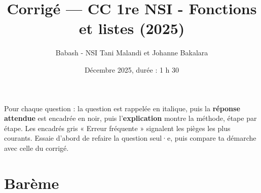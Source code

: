 \documentclass[addpoints, 11pt]{exam}
\title{Corrigé --- CC 1re NSI - Fonctions et listes (2025)}
\author{Babash - NSI Tani Malandi et Johanne Bakalara}
\date{Décembre 2025, durée : 1 h 30}
\DeclareRobustCommand{\_}{\textunderscore\allowbreak}
\begin{document}
\pagestyle{headandfoot}
\firstpageheader{}{}{}

\maketitle
\thispagestyle{headandfoot}

\begin{astuce}
Pour chaque question : la question est rappelée en italique, puis la \textbf{réponse attendue} est encadrée en noir, puis l'\textbf{explication} montre la méthode, étape par étape.
Les encadrés gris « Erreur fréquente » signalent les pièges les plus courants. Essaie d'abord de refaire la question seul·e, puis compare ta démarche avec celle du corrigé.
\end{astuce}

\section*{Barème}
\begin{center}
  \gradetable[h]
\end{center}
\end{document}
